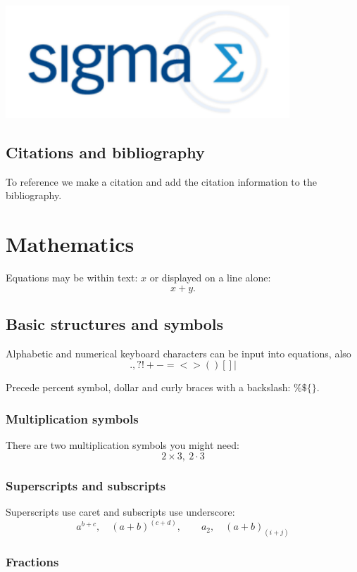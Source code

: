 \documentclass[a4paper,12pt]{extarticle}
\begin{document}
\includegraphics[width=0.8\textwidth]{sigma-logo.png}

\subsection{Citations and bibliography}

To reference we make a citation \cite{latex,ctan} and add the citation information to the bibliography.

\section{Mathematics}

Equations may be within text: \(x\) or displayed on a line alone: \[x+y.\]

\subsection{Basic structures and symbols}

Alphabetic and numerical keyboard characters can be input into equations, also
\[. , ? ! + - = < > ( ) [ ] |\]

Precede percent symbol, dollar and curly braces with a backslash: \( \% \$ \{ \}\).

\subsubsection{Multiplication symbols}

There are two multiplication symbols you might need:
\[2\times 3,\ 2\cdot 3\]

\subsubsection{Superscripts and subscripts}

Superscripts use caret and subscripts use underscore:
\[
a^{b+c}, \quad (a+b)^{(c+d)}, \qquad a_2, \quad (a+b)_{(i+j)}
\]

\subsubsection{Fractions}
\end{document}

